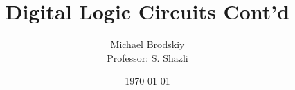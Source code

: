 


\pagestyle{fancy}

\title{Digital Logic Circuits Cont'd}
\date{\today}
\author{Michael Brodskiy\\ \small Professor: S. Shazli}



\maketitle

\thispagestyle{fancy}

\newpage


